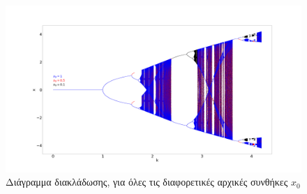 \begin{figure}[ht]
	\centering
	\includegraphics[width=1\linewidth]{LateX images/sine q=-0.5/g11}
	\caption{Διάγραμμα διακλάδωσης, για όλες τις διαφορετικές αρχικές συνθήκες $x_0$}
	\label{f:g57}
\end{figure}

